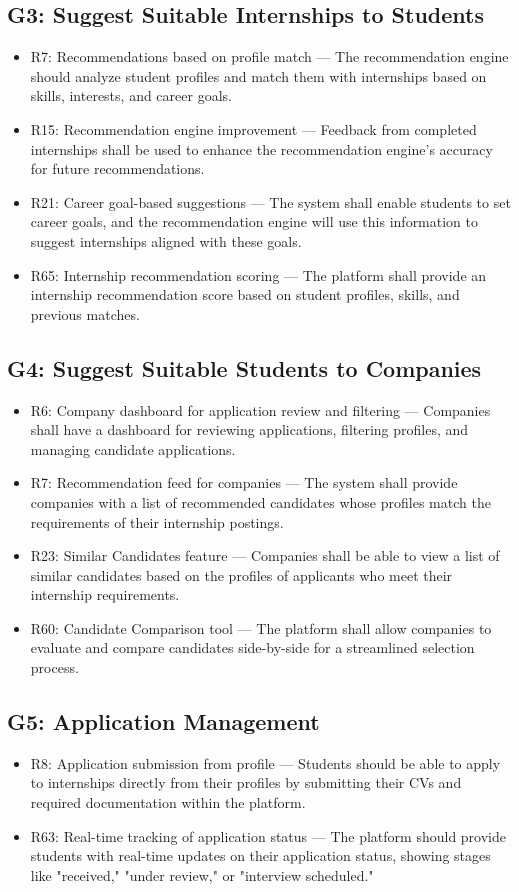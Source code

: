 \subsection{G3: Suggest Suitable Internships to Students}
\begin{itemize}
    \item R7: Recommendations based on profile match — The recommendation engine should analyze student profiles and match them with internships based on skills, interests, and career goals.
    \item R15: Recommendation engine improvement — Feedback from completed internships shall be used to enhance the recommendation engine’s accuracy for future recommendations.
    \item R21: Career goal-based suggestions — The system shall enable students to set career goals, and the recommendation engine will use this information to suggest internships aligned with these goals.
    \item R65: Internship recommendation scoring — The platform shall provide an internship recommendation score based on student profiles, skills, and previous matches.
\end{itemize}

\subsection{G4: Suggest Suitable Students to Companies}
\begin{itemize}
    \item R6: Company dashboard for application review and filtering — Companies shall have a dashboard for reviewing applications, filtering profiles, and managing candidate applications.
    \item R7: Recommendation feed for companies — The system shall provide companies with a list of recommended candidates whose profiles match the requirements of their internship postings.
    \item R23: Similar Candidates feature — Companies shall be able to view a list of similar candidates based on the profiles of applicants who meet their internship requirements.
    \item R60: Candidate Comparison tool — The platform shall allow companies to evaluate and compare candidates side-by-side for a streamlined selection process.
\end{itemize}

\subsection{G5: Application Management}
\begin{itemize}
    \item R8: Application submission from profile — Students should be able to apply to internships directly from their profiles by submitting their CVs and required documentation within the platform.
    \item R63: Real-time tracking of application status — The platform should provide students with real-time updates on their application status, showing stages like "received," "under review," or "interview scheduled."
\end{itemize}

